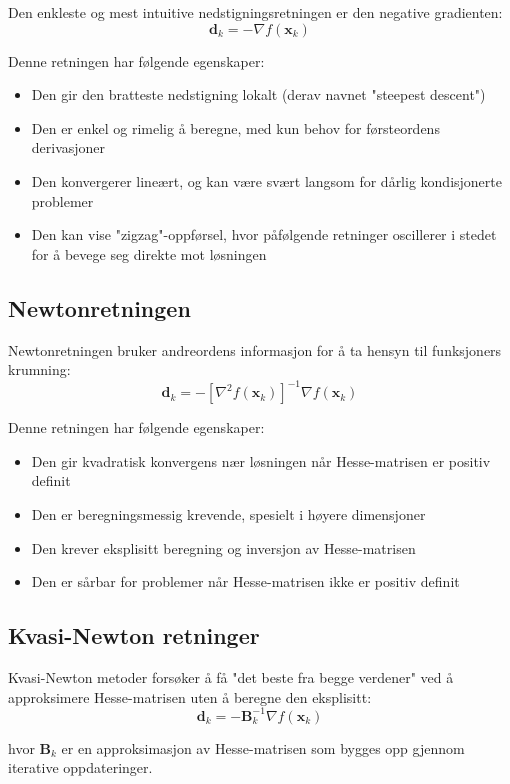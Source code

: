 Den enkleste og mest intuitive nedstigningsretningen er den negative gradienten:
\[
	\symbf{d}_k = -\nabla f(\symbf{x}_k)
\]

Denne retningen har følgende egenskaper:
\begin{itemize}
	\item Den gir den bratteste nedstigning lokalt (derav navnet "steepest descent")
	\item Den er enkel og rimelig å beregne, med kun behov for førsteordens derivasjoner
	\item Den konvergerer lineært, og kan være svært langsom for dårlig kondisjonerte problemer
	\item Den kan vise "zigzag"-oppførsel, hvor påfølgende retninger oscillerer i stedet for å bevege seg direkte mot løsningen
\end{itemize}


\subsection{Newtonretningen}
\label{subsec:newton_direction}

Newtonretningen bruker andreordens informasjon for å ta hensyn til funksjoners krumning:
\[
	\symbf{d}_k = -[\nabla^2 f(\symbf{x}_k)]^{-1}\nabla f(\symbf{x}_k)
\]

Denne retningen har følgende egenskaper:
\begin{itemize}
	\item Den gir kvadratisk konvergens nær løsningen når Hesse-matrisen er positiv definit
	\item Den er beregningsmessig krevende, spesielt i høyere dimensjoner
	\item Den krever eksplisitt beregning og inversjon av Hesse-matrisen
	\item Den er sårbar for problemer når Hesse-matrisen ikke er positiv definit
\end{itemize}

\subsection{Kvasi-Newton retninger}
\label{subsec:quasi_newton_directions}

Kvasi-Newton metoder forsøker å få "det beste fra begge verdener" ved å approksimere Hesse-matrisen uten å beregne den eksplisitt:
\[
	\symbf{d}_k = -\symbf{B}_k^{-1}\nabla f(\symbf{x}_k)
\]

hvor \(\symbf{B}_k\) er en approksimasjon av Hesse-matrisen som bygges opp gjennom iterative oppdateringer.

